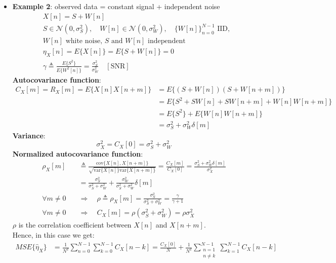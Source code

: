 \begin{itemize}
\item \textbf{Example 2}: observed data = constant signal + independent noise
\[
\begin{aligned}
& X[n] = S + W[n] \\[2ex]
& S \in \mathcal{N}(0, \sigma_S^2), \quad W[n] \in \mathcal{N}(0, \sigma_W^2), \quad \{W[n]\}_{n=0}^{N-1} \text{ IID}, \\[2ex]
& W[n] \text{ white noise, } S \text{ and } W[n] \text{ independent} \\[2ex]
& \eta_X[n] = E\{X[n]\} = E\{S + W[n]\} = 0 \\[2ex]
& \gamma \triangleq \frac{E\{S^2\}}{E\{W^2[n]\}} = \frac{\sigma_S^2}{\sigma_W^2} \quad [\text{SNR}]
\end{aligned}
\]
\noindent\textbf{Autocovariance function}:
\[
\begin{aligned}
C_X[m] = R_X[m] = E\{X[n] X[n+m]\} 
&= E\{ (S + W[n])(S + W[n+m]) \} 
\\[2ex]
&= E\{ S^2 + S W[n] + S W[n+m] + W[n]W[n+m] \}
\\[2ex]
&= E\{S^2\} + E\{W[n]W[n+m]\}
\\[2ex]
&= \sigma_S^2 + \sigma_W^2 \delta[m]
\end{aligned}
\]
\noindent\textbf{Variance}:
\[
\sigma_X^2=C_X[0]=\sigma_S^2+\sigma_W^2
\]
\noindent\textbf{Normalized autocovariance function}:
\[
\begin{aligned}
\rho_X[m] &\triangleq \frac{\text{cov} \{ X[n], X[n+m] \}}{\sqrt{\text{var}\{ X[n] \} \text{var}\{ X[n+m] \}}}
= \frac{C_X[m]}{C_X[0]} = \frac{\sigma_S^2 + \sigma_W^2 \delta[m]}{\sigma_X^2}
\\[2ex]
&= \frac{\sigma_S^2}{\sigma_S^2 + \sigma_W^2}
+ \frac{\sigma_W^2}{\sigma_S^2 + \sigma_W^2} \delta[m]
\\[2ex]
\forall m \neq 0 \quad &\Rightarrow \quad \rho \triangleq \rho_X[m] = \frac{\sigma_S^2}{\sigma_S^2 + \sigma_W^2} = \frac{\gamma}{\gamma + 1}
\\[2ex]
\forall m \neq 0 \quad &\Rightarrow \quad C_X[m] = \rho (\sigma_S^2 + \sigma_W^2) = \rho \sigma_X^2
\end{aligned}
\]
\noindent\(\rho\) is the correlation coefficient between \(X[n]\) and \(X[n+m]\).\\
\noindent Hence, in this case we get:
\[
\begin{aligned}
MSE\{\hat{\eta}_X\}
&= \frac{1}{N^2} \sum_{n=0}^{N-1}\sum_{k=0}^{N-1} C_X[n-k]
= \frac{C_X[0]}{N} + \frac{1}{N^2} \sum_{\substack{n=1 \\ n\neq k}}^{N-1}\sum_{k=1}^{N-1} C_X[n-k]

\end{aligned}\]
\end{itemize}

